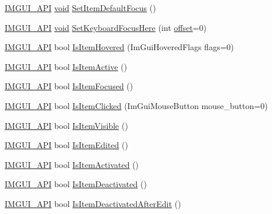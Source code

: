 \begin{DoxyCompactItemize}
\item 
\hyperlink{imgui_8h_a43829975e84e45d1149597467a14bbf5}{I\+M\+G\+U\+I\+\_\+\+A\+PI} \hyperlink{imgui__impl__opengl3__loader_8h_ac668e7cffd9e2e9cfee428b9b2f34fa7}{void} \hyperlink{namespaceImGui_a3720a69496e9b8cf110a11dfe7d334e6}{Set\+Item\+Default\+Focus} ()
\item 
\hyperlink{imgui_8h_a43829975e84e45d1149597467a14bbf5}{I\+M\+G\+U\+I\+\_\+\+A\+PI} \hyperlink{imgui__impl__opengl3__loader_8h_ac668e7cffd9e2e9cfee428b9b2f34fa7}{void} \hyperlink{namespaceImGui_ae85e5fba7e88cea8bd3ba5b687c979f2}{Set\+Keyboard\+Focus\+Here} (int \hyperlink{imgui__impl__opengl3__loader_8h_ae1b92ae085ddef4b1cdca7d749339fb0}{offset}=0)
\item 
\hyperlink{imgui_8h_a43829975e84e45d1149597467a14bbf5}{I\+M\+G\+U\+I\+\_\+\+A\+PI} bool \hyperlink{namespaceImGui_ac9a400eff3a9561d95e80486c52a660b}{Is\+Item\+Hovered} (Im\+Gui\+Hovered\+Flags flags=0)
\item 
\hyperlink{imgui_8h_a43829975e84e45d1149597467a14bbf5}{I\+M\+G\+U\+I\+\_\+\+A\+PI} bool \hyperlink{namespaceImGui_a2d8ac4569456a8003e4dddd39caf771c}{Is\+Item\+Active} ()
\item 
\hyperlink{imgui_8h_a43829975e84e45d1149597467a14bbf5}{I\+M\+G\+U\+I\+\_\+\+A\+PI} bool \hyperlink{namespaceImGui_add3290865a67327258c3a32b695adb28}{Is\+Item\+Focused} ()
\item 
\hyperlink{imgui_8h_a43829975e84e45d1149597467a14bbf5}{I\+M\+G\+U\+I\+\_\+\+A\+PI} bool \hyperlink{namespaceImGui_a11ae401d73ed6b044ba46add5db54617}{Is\+Item\+Clicked} (Im\+Gui\+Mouse\+Button mouse\+\_\+button=0)
\item 
\hyperlink{imgui_8h_a43829975e84e45d1149597467a14bbf5}{I\+M\+G\+U\+I\+\_\+\+A\+PI} bool \hyperlink{namespaceImGui_a0e9273fc53bdf7ca39d59cdb657c3c2f}{Is\+Item\+Visible} ()
\item 
\hyperlink{imgui_8h_a43829975e84e45d1149597467a14bbf5}{I\+M\+G\+U\+I\+\_\+\+A\+PI} bool \hyperlink{namespaceImGui_a6508c0e1f28d1e7f9328a944b4f35ff7}{Is\+Item\+Edited} ()
\item 
\hyperlink{imgui_8h_a43829975e84e45d1149597467a14bbf5}{I\+M\+G\+U\+I\+\_\+\+A\+PI} bool \hyperlink{namespaceImGui_a574b7cecdeb707c429edc827c49983f5}{Is\+Item\+Activated} ()
\item 
\hyperlink{imgui_8h_a43829975e84e45d1149597467a14bbf5}{I\+M\+G\+U\+I\+\_\+\+A\+PI} bool \hyperlink{namespaceImGui_ada3b1cb76907bb9e630b2482f52f0599}{Is\+Item\+Deactivated} ()
\item 
\hyperlink{imgui_8h_a43829975e84e45d1149597467a14bbf5}{I\+M\+G\+U\+I\+\_\+\+A\+PI} bool \hyperlink{namespaceImGui_a8bb4c0fc2b9d0e90249310bb4e822485}{Is\+Item\+Deactivated\+After\+Edit} ()

\end{DoxyCompactItemize}
